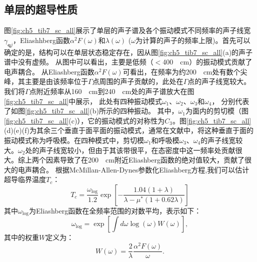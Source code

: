 \subsection{单层的超导性质}
图\ref{fig:ch5_tib7_sc_all}展示了单层的声子谱及各个振动模式不同频率的声子线宽$\gamma_{\bm{q}j}$，Eliashhberg函数$\alpha^2 F(\omega)$和$\lambda(\omega)$ ($\omega$为计算的声子的频率上限)。首先可以确定的是，结构可以在单层状态稳定存在，因从图\ref{fig:ch5_tib7_sc_all}(a)的声子谱中没有虚频。
从图中可以看出，主要是低频（$<$\SI{400}{\per\cm}）的振动模式贡献了电声耦合。
从Eliashberg函数$\alpha^2 F(\omega)$可看出，在频率为约\SI{200}{\per\cm}处有数个尖峰，其主要是由该频率位于$\Gamma$点周围的声子贡献的，此处在$\Gamma$点的声子线宽较大。我们将$\Gamma$点附近频率从\SI{160}{\per\cm}到\SI{240}{\per\cm}处的声子谱放大在图\ref{fig:ch5_tib7_sc_all}中展示，
此处有四种振动模式$\omega_1$、$\omega_2$、$\omega_3$和$\omega_4$，
分别代表了如图\ref{fig:ch5_tib7_sc_all}(b)所示的四种振动。
其中，$\omega_1$为面内的剪切模（图\ref{fig:ch5_tib7_sc_all}(c)），它的振动模式的对称性为$C_3$。图\ref{fig:ch5_tib7_sc_all}(d)(e)(f)为其余三个垂直于面平面的振动模式，通常在文献中，将这种垂直于面的振动模式称为呼吸模。在四种模式中，剪切模$\omega_1$和呼吸模$\omega_3$、$\omega_4$的声子线宽较大。$\omega_2$处的声子线宽较小，但由于其该带很平，在态密度中这一频率处贡献很大。综上两个因素导致了在\SI{200}{\per\cm}附近Eliashberg函数的绝对值较大，贡献了很大的电声耦合。
根据McMillan-Allen-Dynes参数化Eliashberg方程,我们可以估计超导临界温度$T_c$：
\begin{equation}
  T_c = \frac{\omega_{\mathrm{log}}}{1.2}
  \exp{\left[ {-\frac{1.04(1+\lambda)}{\lambda-\mu^*(1+0.62\lambda)}} \right]}
\end{equation}
其中$\omega_{\mathrm{log}}$为Eliashberg函数在全频率范围的对数平均，表示如下：
\begin{equation}
  \omega_\mathrm{log} = \exp \left[ {\int d\omega \log(\omega)W(\omega)} \right],
\end{equation}
其中的权重$W$定义为：
\begin{equation}
  W(\omega) = \frac{2}{\lambda} \frac{\alpha^2 F(\omega)}{\omega}.
\end{equation}

